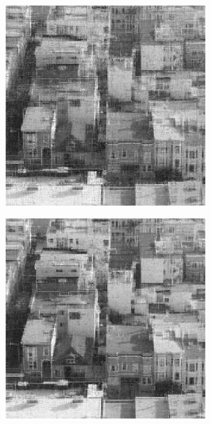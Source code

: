 \begin{figure}
    \begin{subfigure}{0.325\linewidth}
        \includegraphics[width=\linewidth]{Poglavja/Slike/kompleksnost/kompleksna grayscale 300/rez35TNNM.png}
    \end{subfigure}
    \hfill
    \begin{subfigure}{0.325\linewidth}
        \includegraphics[width=\linewidth]{Poglavja/Slike/kompleksnost/kompleksna grayscale 300/rez45TNNM.png}

\end{subfigure}
\end{figure}
